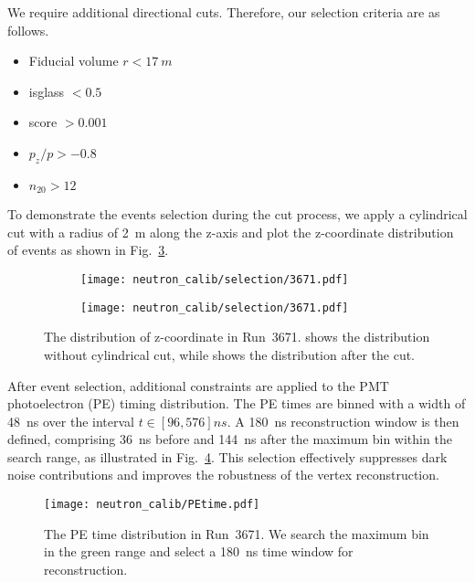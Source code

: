 We require additional directional cuts. Therefore, our selection criteria are as follows.
\begin{itemize}
	\item Fiducial volume $r < \SI{17}{m}$
	\item isglass $< 0.5$
	\item score $>0.001$
	\item $p_z/p>-0.8$
	\item $n_{20}>12$
\end{itemize}
To demonstrate the events selection during the cut process, we apply a cylindrical cut with a radius of \SI{2}{m} along the z-axis and plot the z-coordinate distribution of events as shown in Fig.~\ref{fig:selectionFromBaona}.

\begin{figure}[htbp]
	\centering
	\begin{subfigure}{0.5\textwidth}
		\centering
		\texttt{[image: neutron\_calib/selection/3671.pdf]}
		\label{fig:nocylinder}
	\end{subfigure}%
	\begin{subfigure}{0.5\textwidth}
		\centering
		\texttt{[image: neutron\_calib/selection/3671.pdf]}
		\label{fig:cylinder}
	\end{subfigure}
	\caption{The distribution of z-coordinate in Run~3671.  shows the distribution without cylindrical cut, while  shows the distribution after the cut.}
	\label{fig:selectionFromBaona}
\end{figure}

After event selection, additional constraints are applied to the PMT photoelectron (PE) timing distribution.
The PE times are binned with a width of \SI{48}{ns} over the interval $t \in [96,576]\si{ns}$.
A \SI{180}{ns} reconstruction window is then defined, comprising \SI{36}{ns} before and \SI{144}{ns} after the maximum bin within the search range, as illustrated in Fig.~\ref{fig:PEtime}.
This selection effectively suppresses dark noise contributions and improves the robustness of the vertex reconstruction.
\begin{figure}[htbp]
	\centering
	\texttt{[image: neutron\_calib/PEtime.pdf]}
	\caption{The PE time distribution in Run~3671. We search the maximum bin in the green range and select a \SI{180}{ns} time window for reconstruction.}
	\label{fig:PEtime}
\end{figure}

